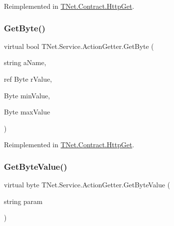 Reimplemented in \mbox{\hyperlink{class_t_net_1_1_contract_1_1_http_get_a4f28c7438a62cd67378d8558b8974a41}{T\+Net.\+Contract.\+Http\+Get}}.

\mbox{\label{class_t_net_1_1_service_1_1_action_getter_a358fcc217a92681c14c8e8d3e59f2dfb}} 
\subsubsection{\texorpdfstring{Get\+Byte()}{GetByte()}\hspace{0.1cm}{\footnotesize\ttfamily [3/3]}}
{\footnotesize\ttfamily virtual bool T\+Net.\+Service.\+Action\+Getter.\+Get\+Byte (\begin{DoxyParamCaption}\item[{string}]{a\+Name,  }\item[{ref Byte}]{r\+Value,  }\item[{Byte}]{min\+Value,  }\item[{Byte}]{max\+Value }\end{DoxyParamCaption})\hspace{0.3cm}{\ttfamily [virtual]}}







Reimplemented in \mbox{\hyperlink{class_t_net_1_1_contract_1_1_http_get_a99dfa18e03bf43ac3dd539ea0d0f5ee6}{T\+Net.\+Contract.\+Http\+Get}}.

\mbox{\label{class_t_net_1_1_service_1_1_action_getter_a3b6b4ef30e7a8ba8d39a1cec87eae4d1}} 
\subsubsection{\texorpdfstring{Get\+Byte\+Value()}{GetByteValue()}\hspace{0.1cm}{\footnotesize\ttfamily [1/2]}}
{\footnotesize\ttfamily virtual byte T\+Net.\+Service.\+Action\+Getter.\+Get\+Byte\+Value (\begin{DoxyParamCaption}\item[{string}]{param }\end{DoxyParamCaption})\hspace{0.3cm}{\ttfamily [virtual]}}







